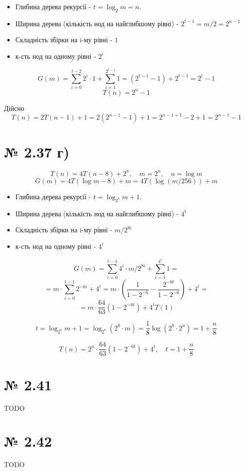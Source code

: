 \documentclass[11pt, a4paper]{article} %
\begin{document}
\begin{itemize}
    \item Глибина дерева рекурсії - $t = \log_2 m  = n$.
    \item Ширина дерева (кількість нод на найглибшому рівні) - $2^{t-1} = m/2 = 2^{n-1}$
    \item Складність збірки на i-му рівні - $1$
    \item к-сть нод на одному рівні - $2^i$
\end{itemize}

$$G(m) = \sum_{i=0}^{t-2} 2^i\cdot 1 + \sum_{i=1}^{2^{t-1}} 1 = (2^{t-1}-1) + 2^{t-1} = 2^t - 1$$
$$T(n) = 2^n - 1$$

Дійсно
$$T(n) = 2T(n-1) + 1 = 2(2^{n-1} - 1) + 1 = 2^{n-1+1} -2 + 1 = 2^{n-1} - 1$$

\section*{№ 2.37 г)}
$$T(n) = 4T(n-8) +2^n, \quad m=2^n, \quad n = \log m$$
$$G(m) = 4T(\log m - 8) + m = 4T(\log (m/256)) + m $$

\begin{itemize}
    \item Глибина дерева рекурсії - $t = \log_{2^8} m + 1$.
    \item Ширина дерева (кількість нод на найглибшому рівні) - $4^{t}$
    \item Складність збірки на i-му рівні - $m/2^{8i}$
    \item к-сть нод на одному рівні - $4^i$
\end{itemize}

$$G(m) = \sum_{i=0}^{t-1} 4^i\cdot m/2^{8i} + \sum_{i=1}^{4^t} 1 = $$
$$= m \cdot \sum_{i=0}^{t-1} 2^{-6i} + 4^t = m \cdot (\frac{1}{1-2^{-6}} - \frac{2^{-6t}}{1-2^{-6}})  + 4^t = $$
$$= m \cdot \frac{64}{63} ( 1 - 2^{-6t} ) + 4^t T(1) $$

$$t = \log_{2^8} m + 1 = \log_{2^8} (2^8 \cdot m) = \frac{1}{8} \log (2^8 \cdot 2^n) = 1 + \frac{n}{8}$$

$$T(n) = 2^n \cdot \frac{64}{63} ( 1 - 2^{-6t} ) + 4^t, \quad t = 1 + \frac{n}{8} $$


\section*{№ 2.41}
TODO

\section*{№ 2.42}
TODO
\end{document}
